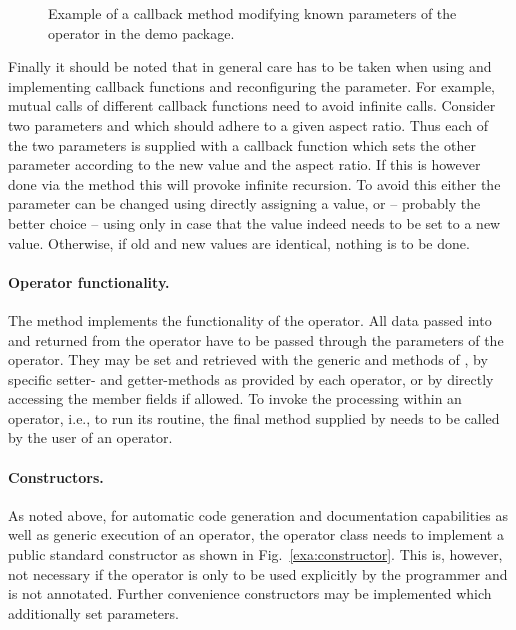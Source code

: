 \begin{figure}[h]

\caption{\label{exa:callback-method}Example of a callback method modifying known parameters of the operator   in the demo package.}
\end{figure}

Finally it should be noted that in general care has to be taken when using and implementing callback functions
and reconfiguring the parameter.
For example, mutual calls of different callback functions need to avoid infinite calls.
Consider two parameters  and  which should adhere to a given aspect ratio.
Thus each of the two parameters is supplied with a callback function which sets the 
other parameter according to the new value and the aspect ratio.
If this is however done via the  method this will provoke infinite recursion.
To avoid this either the parameter can be changed using directly assigning a value,
or -- probably the better choice -- using   only in case that the value indeed needs to be set to a new value.
Otherwise, if old and new values are identical, nothing is to be done.

\paragraph{Operator functionality.}
The method  implements the functionality of the operator. All data
passed into and returned from the operator have to be passed through the parameters of the operator.
They may be set and retrieved with the generic
 and  methods
of , by specific setter- and getter-methods as provided by
each operator, or by
directly accessing the member fields if allowed.
To invoke the processing within an operator, i.e., to run its 
routine, the final method  supplied by  needs to be called by the user of an operator.

\paragraph{Constructors.}
As noted above, 
for automatic code generation and documentation capabilities as well as generic execution 
of an operator,
the operator class needs to implement 
a public standard constructor 
as shown in Fig.~\ref{exa:constructor}.
This is, however, not necessary if the operator is only to be used explicitly
by the programmer and is not annotated.
Further convenience constructors may be implemented which additionally set
parameters.

